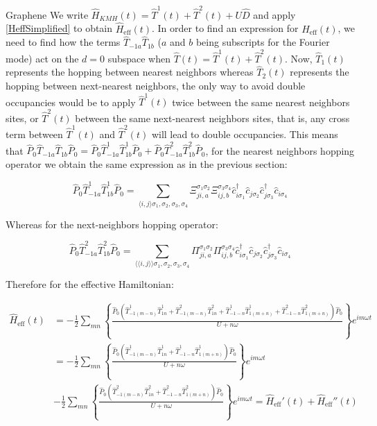 \begin{section}{Graphene}
We write $\hat{H}_{KMH}(t) = \hat{T}^1(t) + \hat{T}^2(t) + U\hat{D}$ and apply \ref{HeffSimplified} to obtain $\hat{H}_{\text{eff}}(t)$. In order to find an expression for $\hat{H}_{\text{eff}}(t)$, we need to find how the terms $\hat{T}_{-1a}\hat{T}_{1b}$ ($a$ and $b$ being subscripts for the Fourier mode) act on the $d=0$ subspace when $\hat{T}(t) = \hat{T}^1(t) + \hat{T}^2(t)$. Now, $\hat{T}_1(t)$ represents the hopping between nearest neighbors whereas $\hat{T}_2(t)$ represents the hopping between next-nearest neighbors, the only way to avoid double occupancies would be to apply $\hat{T}^1(t)$ twice between the same nearest neighbors sites, or $\hat{T}^2(t)$ between the same next-nearest neighbors sites, that is, any cross term between $\hat{T}^1(t)$ and $\hat{T}^2(t)$ will lead to double occupancies. This means that $\hat{P}_0\hat{T}_{-1a}\hat{T}_{1b}\hat{P}_0 = \hat{P}_0\hat{T}_{-1a}^1\hat{T}_{1b}^1\hat{P}_0+\hat{P}_0\hat{T}_{-1a}^2\hat{T}_{1b}^2\hat{P}_0$, for the nearest neighbors hopping operator we obtain the same expression as in the previous section:

\begin{equation}
\hat{P}_0 \hat{T}_{-1a}^1\hat{T}_{1b}^1 \hat{P}_0 = \sum_{\langle i,j \rangle \sigma_1, \sigma_2, \sigma_3, \sigma_4} \Xi_{ji,a}^{\sigma_1\sigma_2}\Xi_{ij,b}^{\sigma_3\sigma_4} \hat{c}_{i\sigma_1}^\dagger\hat{c}_{j\sigma_2}\hat{c}_{j\sigma_3}^\dagger\hat{c}_{i\sigma_4}
\end{equation}

Whereas for the next-neighbors hopping operator:

\begin{equation}
\hat{P}_0 \hat{T}_{-1a}^2\hat{T}_{1b}^2 \hat{P}_0 = \sum_{\langle \langle i,j \rangle \rangle \sigma_1, \sigma_2, \sigma_3, \sigma_4} \Pi_{ji,a}^{\sigma_1\sigma_2}\Pi_{ij,b}^{\sigma_3\sigma_4} \hat{c}_{i\sigma_1}^\dagger\hat{c}_{j\sigma_2}\hat{c}_{j\sigma_3}^\dagger\hat{c}_{i\sigma_4}
\end{equation}

Therefore for the effective Hamiltonian:

\begin{align*}
\hat{H}_{\text{eff}}(t) &= -\frac{1}{2}\sum_{mn} \left\{ \frac{\hat{P}_0  (\hat{T}_{-1(m-n)}^1\hat{T}_{1n}^1 + \hat{T}_{-1(m-n)}^2\hat{T}_{1n}^2 + \hat{T}_{-1-n}^1\hat{T}_{1(m+n)}^1 + \hat{T}_{-1-n}^2\hat{T}_{1(m+n)}^2)\hat{P}_0}{U+n\omega} \right\} e^{im\omega t} \\
&= -\frac{1}{2}\sum_{mn} \left\{ \frac{\hat{P}_0  (\hat{T}_{-1(m-n)}^1\hat{T}_{1n}^1 + \hat{T}_{-1-n}^1\hat{T}_{1(m+n)}^1)\hat{P}_0}{U+n\omega} \right\} e^{im\omega t} \\
&-\frac{1}{2}\sum_{mn} \left\{ \frac{\hat{P}_0  (\hat{T}_{-1(m-n)}^2\hat{T}_{1n}^2 + \hat{T}_{-1-n}^2\hat{T}_{1(m+n)}^2)\hat{P}_0}{U+n\omega} \right\} e^{im\omega t} = \hat{H}_{\text{eff}}'(t) + \hat{H}_{\text{eff}}''(t)
\end{align*}


\end{section}

